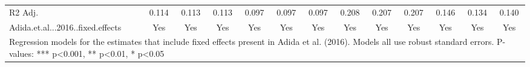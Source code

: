 \begin{table}
\begin{tabular}[t]{lcccccccccccc}
R2 Adj. & \num{0.114} & \num{0.113} & \num{0.113} & \num{0.097} & \num{0.097} & \num{0.097} & \num{0.208} & \num{0.207} & \num{0.207} & \num{0.146} & \num{0.134} & \num{0.140}\\
Adida.et.al...2016..fixed.effects & Yes & Yes & Yes & Yes & Yes & Yes & Yes & Yes & Yes & Yes & Yes & Yes\\
\bottomrule
\multicolumn{13}{l}{\rule{0pt}{1em}Regression models for the estimates that include fixed effects present in Adida et al. (2016). Models all use robust standard errors. P-values: *** p<0.001, ** p<0.01, * p<0.05}\\
\end{tabular}
\end{table}
